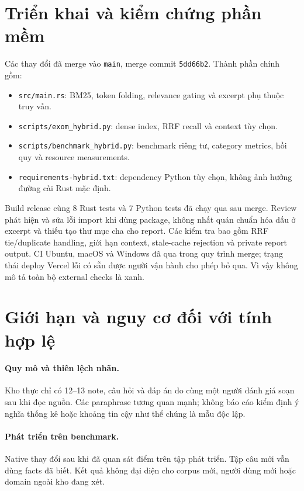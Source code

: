 \documentclass[11pt,a4paper]{article}
\begin{document}
\section{Triển khai và kiểm chứng phần mềm}
Các thay đổi đã merge vào \texttt{main}, merge commit \texttt{5dd66b2}. Thành phần chính gồm:
\begin{itemize}
\item \texttt{src/main.rs}: BM25, token folding, relevance gating và excerpt phụ thuộc truy vấn.
\item \texttt{scripts/exom\_hybrid.py}: dense index, RRF recall và context tùy chọn.
\item \texttt{scripts/benchmark\_hybrid.py}: benchmark riêng tư, category metrics, hồi quy và resource measurements.
\item \texttt{requirements-hybrid.txt}: dependency Python tùy chọn, không ảnh hưởng đường cài Rust mặc định.
\end{itemize}
Build release cùng 8 Rust tests và 7 Python tests đã chạy qua sau merge. Review phát hiện và sửa lỗi import khi dùng package, không nhất quán chuẩn hóa dấu ở excerpt và thiếu tạo thư mục cha cho report. Các kiểm tra bao gồm RRF tie/duplicate handling, giới hạn context, stale-cache rejection và private report output. CI Ubuntu, macOS và Windows đã qua trong quy trình merge; trạng thái deploy Vercel lỗi có sẵn được người vận hành cho phép bỏ qua. Vì vậy không mô tả toàn bộ external checks là xanh.

\section{Giới hạn và nguy cơ đối với tính hợp lệ}
\paragraph{Quy mô và thiên lệch nhãn.} Kho thực chỉ có 12--13 note, câu hỏi và đáp án do cùng một người đánh giá soạn sau khi đọc nguồn. Các paraphrase tương quan mạnh; không báo cáo kiểm định ý nghĩa thống kê hoặc khoảng tin cậy như thể chúng là mẫu độc lập.

\paragraph{Phát triển trên benchmark.} Native thay đổi sau khi đã quan sát điểm trên tập phát triển. Tập câu mới vẫn dùng facts đã biết. Kết quả không đại diện cho corpus mới, người dùng mới hoặc domain ngoài kho đang xét.
\end{document}
